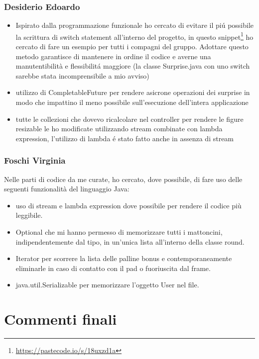 \documentclass[a4paper,12pt]{report}
\begin{document}
\subsection{Desiderio Edoardo}
\begin{itemize}
    \item Ispirato dalla programmazione funzionale ho cercato di evitare il piú possibile la scrittura di switch
          statement all'interno del progetto, in questo snippet\footnote{\url{https://pastecode.io/s/18uxzd1a}} ho cercato
          di fare un esempio per tutti i compagni del gruppo. Adottare questo metodo garantisce di mantenere in ordine il codice
          e averne una manutentibilità e flessibilitá maggiore (la classe Surprise.java con uno switch sarebbe stata incomprensibile a mio avviso)
    \item utilizzo di CompletableFuture per rendere asicrone operazioni dei surprise in modo che impattino il meno possibile
          sull'esecuzione dell'intera applicazione
    \item tutte le collezioni che dovevo ricalcolare nel controller per rendere le figure resizable le ho modificate
          utilizzando stream combinate con lambda expression, l'utilizzo di lambda é stato fatto  anche in assenza di stream
\end{itemize}
\subsection{Foschi Virginia}
Nelle parti di codice da me curate, ho cercato, dove possibile, di fare uso delle seguenti funzionalità del linguaggio Java:
\begin{itemize}
    \item uso di stream e lambda expression dove possibile per rendere il codice più leggibile.
    \item Optional che mi hanno permesso di memorizzare tutti i mattoncini, indipendentemente dal tipo, in un'unica lista all'interno della classe round.
    \item Iterator per scorrere la lista delle palline bonus e contemporaneamente eliminarle in caso di contatto con il pad o fuoriuscita dal frame.
    \item java.util.Serializable per memorizzare l'oggetto User nel file.
\end{itemize}


\chapter{Commenti finali}
\end{document}

